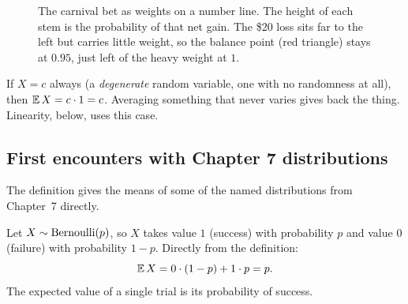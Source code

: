 \begin{figure}[H]
\centering
{}
\caption{The carnival bet as weights on a number line. The height of each stem
is the probability of that net gain. The \$20 loss sits far to the left but
carries little weight, so the balance point (red triangle) stays at $0.95$, just
left of the heavy weight at $1$.}
\label{ch08:fig-loaded-bet}
\end{figure}

\begin{example}
\label{ch08:ex-constant}
If $X = c$ always (a \emph{degenerate} random variable, one with no randomness
at all), then $\operatorname{\mathbb{E}} X = c\cdot 1 = c$. Averaging something that never varies
gives back the thing. Linearity, below, uses this case.
\end{example}

\subsection{First encounters with Chapter 7 distributions}

The definition gives the means of some of the named distributions from
Chapter~7 directly.

\begin{example}
\label{ch08:ex-bern-mean}
Let $X \sim \operatorname{Bernoulli}(p)$, so $X$ takes value $1$ (success) with probability $p$ and
value $0$ (failure) with probability $1-p$. Directly from the definition:
\[
  \operatorname{\mathbb{E}} X = 0\cdot (1-p) + 1\cdot p = p.
\]
The expected value of a single trial is its probability of success.
\end{example}


